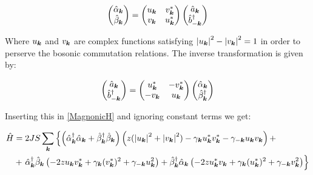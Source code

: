 \begin{equation}
\label{Bogoliubov}
\begin{pmatrix}
\hat{\alpha}_{\boldsymbol{k}} \\
\hat{\beta}_{\boldsymbol{k}}
\end{pmatrix} = 
\begin{pmatrix}
u_{\boldsymbol{k}} & v_{\boldsymbol{k}}^* \\
v_{\boldsymbol{k}} & u_{\boldsymbol{k}}^*
\end{pmatrix}
\begin{pmatrix}
\hat{a}_{\boldsymbol{k}} \\
\hat{b}_{-\boldsymbol{k}}^\dagger
\end{pmatrix}
\end{equation}

Where $u_{\boldsymbol{k}}$ and $v_{\boldsymbol{k}}$ are complex functions satisfying $\abs{u_{\boldsymbol{k}}}^2-\abs{v_{\boldsymbol{k}}}^2 = 1$ in order to perserve the bosonic commutation relations. The inverse transformation is given by:

\begin{equation}
\label{BogoliubovInv}
\begin{pmatrix}
\hat{a}_{\boldsymbol{k}} \\
\hat{b}_{-\boldsymbol{k}}^\dagger
\end{pmatrix} = 
\begin{pmatrix}
u_{\boldsymbol{k}}^* & -v_{\boldsymbol{k}}^* \\
-v_{\boldsymbol{k}} & u_{\boldsymbol{k}}
\end{pmatrix}
\begin{pmatrix}
\hat{\alpha}_{\boldsymbol{k}} \\
\hat{\beta}_{\boldsymbol{k}}^\dagger
\end{pmatrix}
\end{equation}

Inserting this in \ref{MagnonicH} and ignoring constant terms we get:

\begin{align}
\hat{H} &= 2JS \sum_{\boldsymbol{k}} \left\{ \left( \hat{\alpha}_{\boldsymbol{k}}^\dagger \hat{\alpha}_{\boldsymbol{k}} +\hat{\beta}_{\boldsymbol{k}}^\dagger \hat{\beta}_{\boldsymbol{k}} \right) \left( z(\abs{u_{\boldsymbol{k}}}^2+\abs{v_{\boldsymbol{k}}}^2) -\gamma_{\boldsymbol{k}}u_{\boldsymbol{k}}^*v_{\boldsymbol{k}}^* - \gamma_{-\boldsymbol{k}}u_{\boldsymbol{k}}v_{\boldsymbol{k}} \right) + \right. \nonumber \\
&+ \left.  \hat{\alpha}^\dagger_{\boldsymbol{k}} \hat{\beta}_{\boldsymbol{k}} \left( -2zu_{\boldsymbol{k}}v_{\boldsymbol{k}}^* + \gamma_{\boldsymbol{k}}(v_{\boldsymbol{k}}^*)^2+\gamma_{-\boldsymbol{k}}u_{\boldsymbol{k}}^2 \right) + \hat{\beta}_{\boldsymbol{k}}^\dagger\hat{\alpha}_{\boldsymbol{k}} \left( -2zu_{\boldsymbol{k}}^*v_{\boldsymbol{k}} + \gamma_{\boldsymbol{k}}(u_{\boldsymbol{k}}^*)^2+\gamma_{-\boldsymbol{k}}v_{\boldsymbol{k}}^2 \right) \right\} \label{BeforeBogo}
\end{align}

